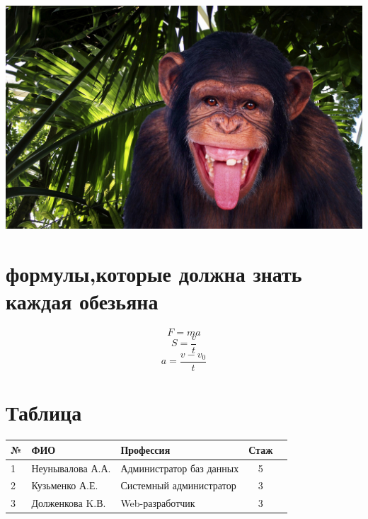 \documentclass[a4paper, 12pt]{report}
\begin{document}
\includegraphics[scale=0.2]{monkey.jpeg}
	\section{формулы,которые должна знать каждая обезьяна}
\begin{equation}
	F = ma
\end{equation}
\begin{equation}
	S=\frac{v}{t}
\end{equation}
\begin{equation}
	a=\frac{v-v_0}{t}
\end{equation}	
\section{Таблица}
\begin{tabular}{l||l|l|cc}
	\hline
	№ & ФИО & Профессия & Стаж\\
	\hline\hline
	1 & Неунывалова А.А. & Администратор баз данных & 5 \\
	2 & Кузьменко А.Е. & Системный администратор & 3 \\
	3 & Долженкова K.В. & Web-разработчик & 3
\end{tabular}
\printbibliogr
\end{document}

